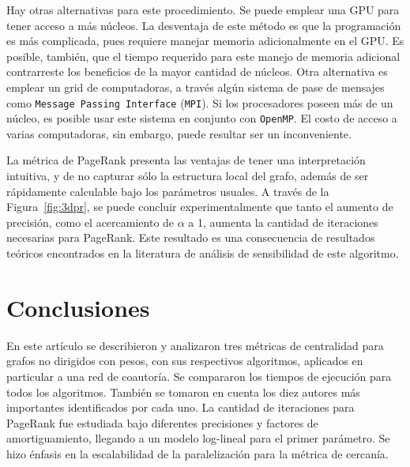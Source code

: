 \documentclass[journal]{IEEEtran}
\newcommand{\pkg}[1]{\texttt{#1}}
\begin{document}
Hay otras alternativas para este procedimiento. Se puede emplear una GPU para tener acceso a más núcleos. La desventaja de este método es que la programación es más complicada, pues requiere manejar memoria adicionalmente en el GPU. Es posible, también, que el tiempo requerido para este manejo de memoria adicional contrarreste los beneficios de la mayor cantidad de núcleos. Otra alternativa es emplear un grid de computadoras, a través algún sistema de pase de mensajes como \pkg{Message Passing Interface} (\pkg{MPI}). Si los procesadores poseen más de un núcleo, es posible usar este sistema en conjunto con \pkg{OpenMP}. El costo de acceso a varias computadoras, sin embargo, puede resultar ser un inconveniente.

La métrica de PageRank presenta las ventajas de tener una interpretación intuitiva, y de no capturar sólo la estructura local del grafo, además de ser rápidamente calculable bajo los parámetros usuales. A través de la Figura~\ref{fig:3dpr}, se puede concluir experimentalmente que tanto el aumento de precisión, como el acercamiento de \(\alpha\) a 1, aumenta la cantidad de iteraciones necesarias para PageRank. Este resultado es una consecuencia de resultados teóricos encontrados en la literatura de análisis de sensibilidad de este algoritmo\cite{stanford}.
\section{Conclusiones}
En este artículo se describieron y analizaron tres métricas de centralidad para grafos no dirigidos con pesos, con sus respectivos algoritmos, aplicados en particular a una red de coautoría. Se compararon los tiempos de ejecución para todos los algoritmos. También se tomaron en cuenta los diez autores más importantes identificados por cada uno. La cantidad de iteraciones para PageRank fue estudiada bajo diferentes precisiones y factores de amortiguamiento, llegando a un modelo log-lineal para el primer parámetro. Se hizo énfasis en la escalabilidad de la paralelización para la métrica de cercanía.
\ifCLASSOPTIONcaptionsoff
  \newpage
\fi

\end{document}
